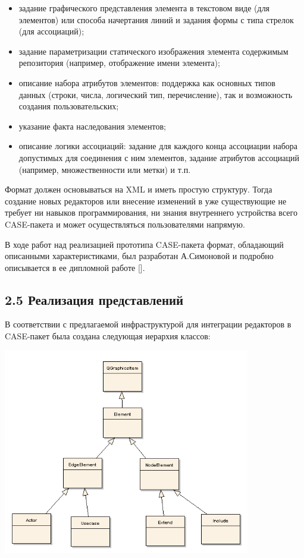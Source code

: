 \documentclass[a4paper]{article}
\newcommand\liststyleWWviiiNumvi{%
\renewcommand\theenumi{\arabic{enumi}}
\renewcommand\theenumii{\arabic{enumii}}
\renewcommand\theenumiii{\arabic{enumiii}}
\renewcommand\labelitemi{o}
\renewcommand\labelenumi{\theenumi.}
\renewcommand\labelenumii{\theenumii.}
\renewcommand\labelenumiii{\theenumiii.}
}
\begin{document}
\liststyleWWviiiNumvi
\begin{itemize}
\item {
задание графического представления элемента в текстовом виде (для
элементов) или способа начертания линий и задания формы с типа стрелок
(для ассоциаций);}
\item {
задание параметризации статического изображения элемента содержимым
репозитория (например, отображение имени элемента);}
\item {
описание набора атрибутов элементов: поддержка как основных типов данных
(строки, числа, логический тип, перечисление), так и возможность
создания пользовательских;}
\item {
указание факта наследования элементов;}
\item {
описание логики ассоциаций: задание для каждого конца ассоциации набора
допустимых для соединения с ним элементов, задание атрибутов ассоциаций
(например, множественности или метки) и т.п.}
\end{itemize}
{
Формат должен основываться на \foreignlanguage{english}{XML} и иметь
простую структуру. Тогда создание новых редакторов или внесение
изменений в уже существующие не требует ни навыков программирования, ни
знания внутреннего устройства всего
\foreignlanguage{english}{CASE}{}-пакета и может осуществляться
пользователями напрямую.}

{
В ходе работ над реализацией прототипа
\foreignlanguage{english}{CASE}{}-пакета формат, обладающий описанными
характеристиками, был разработан А.Симоновой и подробно описывается в
ее дипломной работе []. }

\subsection[2.5 Реализация представлений ]{2.5 Реализация представлений
}
{
В соответствии с предлагаемой инфраструктурой для интеграции редакторов
в \foreignlanguage{english}{CASE}{}-пакет была создана следующая
иерархия классов:}

{
\includegraphics[width=10.786cm,height=9.038cm]{draft04-img2.png} \par}
\end{document}
